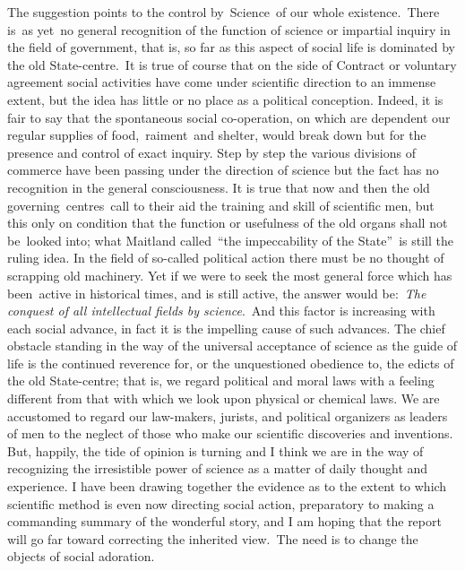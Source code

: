 \documentclass[openany,nobib]{tufte-book}
\begin{document}
The suggestion points to the control by~Science~of our whole
existence.~There is~as yet~no general recognition of the function of
science or impartial inquiry in the field of government, that is, so far
as this aspect of social life is dominated by the old State-centre.~It
is true of course that on the side of Contract or voluntary agreement
social activities have come under scientific direction to an immense
extent, but the idea has little or no place as a political conception.
Indeed, it is fair to say that the spontaneous social co-operation, on
which are dependent our regular supplies of food,~raiment~and shelter,
would break down but for the presence and control of exact inquiry. Step
by step the various divisions of commerce have been passing under the
direction of science but the fact has no recognition in the general
consciousness. It is true that now and then the old
governing~centres~call to their aid the training and skill of scientific
men, but this only on condition that the function or usefulness of the
old organs shall not be~looked into; what Maitland called~``the
impeccability of the State''~is still the ruling idea. In the field of
so-called political action there must be no thought of scrapping old
machinery. Yet if we were to seek the most general force which has
been~active in historical times, and is still active, the answer would
be:~\emph{The conquest of all intellectual fields by science}.~And this
factor is increasing with each social advance, in fact it is the
impelling cause of such advances. The chief obstacle standing in the way
of the universal acceptance of science as the guide of life is the
continued reverence for, or the unquestioned obedience to, the edicts of
the old State-centre; that is, we regard political and moral laws with a
feeling different from that with which we look upon physical or chemical
laws. We are accustomed to regard our law-makers, jurists, and political
organizers as leaders of men to the neglect of those who make our
scientific discoveries and inventions. But, happily, the tide of opinion
is turning and I think we are in the way of recognizing the irresistible
power of science as a matter of daily thought and experience. I have
been drawing together the evidence as to the extent to which scientific
method is even now directing social action, preparatory to making a
commanding summary of the wonderful story, and I am hoping that the
report will go far toward correcting the inherited view.~The need is to
change the objects of social adoration.~
\end{document}
